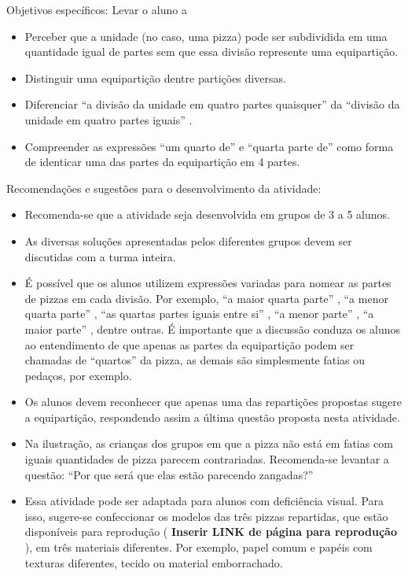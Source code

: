 \documentclass{book}
\begin{document}
  Objetivos específicos: Levar o aluno a

\begin{itemize} %
    \item       Perceber que a unidade (no caso, uma pizza) pode ser subdividida em uma quantidade igual de partes sem que essa divisão represente uma equipartição.
    \item       Distinguir uma equipartição dentre partições diversas.
    \item       Diferenciar       ``a divisão da unidade em quatro partes quaisquer''       da       ``divisão da unidade em quatro partes iguais''      .
    \item       Compreender as expressões       ``um quarto de''       e       ``quarta parte de''       como forma de identicar uma das partes da equipartição em 4 partes.
\end{itemize} %


  Recomendações e sugestões para o desenvolvimento da atividade:

\begin{itemize} %
    \item       Recomenda-se que a atividade seja desenvolvida em grupos de 3 a 5 alunos.
    \item       As diversas soluções apresentadas pelos diferentes grupos devem ser discutidas com a turma inteira.
    \item       É possível que os alunos utilizem expressões variadas para nomear as partes de pizzas em cada divisão. Por exemplo,       ``a maior quarta parte''      ,       ``a menor quarta parte''      ,       ``as quartas partes iguais entre si''      ,       ``a menor parte''      ,       ``a maior parte''      , dentre outras. É importante que a discussão conduza os alunos ao entendimento de que apenas as partes da equipartição podem ser chamadas de       ``quartos''       da pizza, as demais são simplesmente fatias ou pedaços, por exemplo.
    \item       Os alunos devem reconhecer que apenas uma das repartições propostas sugere a equipartição, respondendo assim a última questão proposta nesta atividade.
    \item       Na ilustração, as crianças dos grupos em que a pizza não está em fatias com iguais quantidades de pizza parecem contrariadas. Recomenda-se levantar a questão:       ``Por que será que elas estão parecendo zangadas?''
    \item       Essa atividade pode ser adaptada para alunos com deficiência visual. Para isso, sugere-se confeccionar os modelos das três pizzas repartidas, que estão disponíveis para reprodução (      {\bf Inserir LINK de página para reprodução}      ), em três materiais diferentes. Por exemplo, papel comum e papéis com texturas diferentes, tecido ou material emborrachado.
\end{itemize} %
\end{document}
